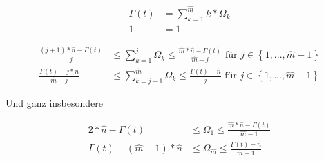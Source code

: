 \vspace{0.6cm}
\vspace{1cm}













\begin{Theorem}\label{theremPartiotionVsGamma}
\vspace{0.3cm}

\begin{align*}
\Gamma(t)&= \sum_{k=1}^{\widehat{m}} k * \Omega_k \tag{i} \\ 
1 &= 1 \tag{ii} 
\end{align*}

\end{Theorem}
\vspace{0.3cm}


\begin{Theorem}\label{theremAbschaetzung}
\vspace{0.3cm}

\begin{align*}
\frac{(j+1) * \widehat{n} - \Gamma(t)}{j} &\leq \sum_{k=1}^{j} \Omega_k \leq \frac{\widehat{m} * \widehat{n} - \Gamma(t)}{\widehat{m} - j} \textrm{ für } j \in \left\{1,...,\widehat{m} - 1 \right\} \tag{i} \\ 
\frac{\Gamma(t) - j * \widehat{n}}{\widehat{m} - j} &\leq \sum_{k=j+1}^{\widehat{m}} \Omega_k \leq \frac{\Gamma(t) - \widehat{n}}{j} \textrm{ für } j \in \left\{1,...,\widehat{m} - 1 \right\} \tag{ii} 
\end{align*}

Und ganz insbesondere

\begin{align*}
2 * \widehat{n} - \Gamma(t) &\leq \Omega_1 \leq \frac{\widehat{m} * \widehat{n} - \Gamma(t)}{\widehat{m} - 1} \tag{iii} \\ 
\Gamma(t) - \left( \widehat{m} - 1 \right) * \widehat{n} &\leq \Omega_{\widehat{m}} \leq \frac{\Gamma(t) - \widehat{n}}{\widehat{m} - 1} \tag{iv} 
\end{align*}

\end{Theorem}
\vspace{0.6cm}


